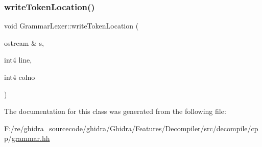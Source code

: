 \subsubsection{\texorpdfstring{writeTokenLocation()}{writeTokenLocation()}}
{\footnotesize\ttfamily void Grammar\+Lexer\+::write\+Token\+Location (\begin{DoxyParamCaption}\item[{ostream \&}]{s,  }\item[{int4}]{line,  }\item[{int4}]{colno }\end{DoxyParamCaption})}



The documentation for this class was generated from the following file\+:\begin{DoxyCompactItemize}
\item 
F\+:/re/ghidra\+\_\+sourcecode/ghidra/\+Ghidra/\+Features/\+Decompiler/src/decompile/cpp/\mbox{\hyperlink{grammar_8hh}{grammar.\+hh}}\end{DoxyCompactItemize}
